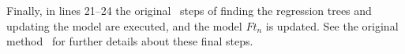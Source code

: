 \documentclass[preprint,review,10pt,3p]{elsarticle}
\begin{document}
Finally, in lines 21--24 the original \lambdamart\ steps of finding the regression trees and updating the model are executed, and the model $Ft_n$ is updated. See the original method~\cite{BLA} for further details about these final steps.
 



\end{document}
